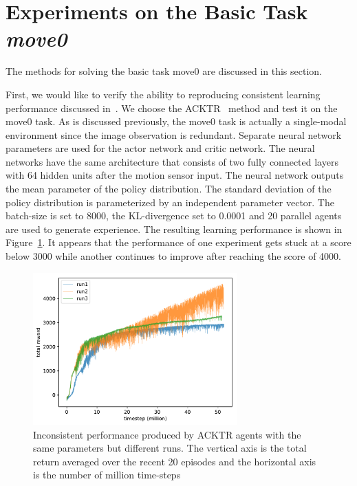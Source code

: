 
\section{Experiments on the Basic Task \textit{move0}}\label{sec_exp_move0}

The methods for solving the basic task move0 are discussed in this section.

First, we would like to verify the ability to reproducing consistent learning performance discussed in~\cite{henderson2017matters}. We choose the ACKTR~\cite{wu2017scalable} method and test it on the move0 task. As is discussed previously, the move0 task is actually a single-modal environment since the image observation is redundant. Separate neural network parameters are used for the actor network and critic network. The neural networks have the same architecture that consists of two fully connected layers with 64 hidden units after the motion sensor input. The neural network outputs the mean parameter of the policy distribution. The standard deviation of the policy distribution is parameterized by an independent parameter vector. The batch-size is set to 8000, the KL-divergence set to 0.0001 and 20 parallel agents are used to generate experience. The resulting learning performance is shown in Figure~\ref{fig_acktr_reprod}. It appears that the performance of one experiment gets stuck at a score below 3000 while another continues to improve after reaching the score of 4000. 
\begin{figure}[!htbp]
	\includegraphics[width=0.7\textwidth]{images/rec_0403_reprod}
	\centering
	\caption{Inconsistent performance produced by ACKTR agents with the same  parameters but different runs. The vertical axis is the total return averaged over the recent 20 episodes and the horizontal axis is the number of million time-steps}\label{fig_acktr_reprod}
\end{figure}

